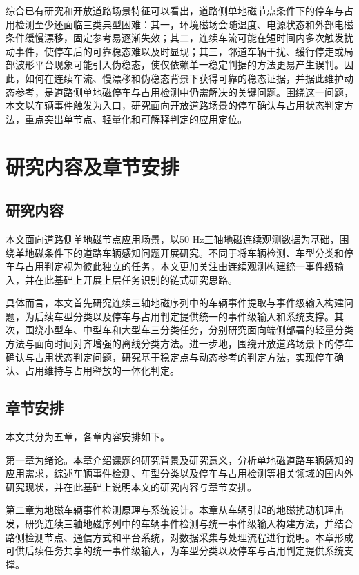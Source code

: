 \documentclass{xdupgthesis}
\begin{document}
综合已有研究和开放道路场景特征可以看出，道路侧单地磁节点条件下的停车与占用检测至少还面临三类典型困难：其一，环境磁场会随温度、电源状态和外部电磁条件缓慢漂移，固定参考易逐渐失效；其二，连续车流可能在短时间内多次触发扰动事件，使停车后的可靠稳态难以及时显现；其三，邻道车辆干扰、缓行停走或局部波形平台现象可能引入伪稳态，使仅依赖单一稳定判据的方法更易产生误判。因此，如何在连续车流、慢漂移和伪稳态背景下获得可靠的稳态证据，并据此维护动态参考，是道路侧单地磁停车与占用检测中仍需解决的关键问题。围绕这一问题，本文以车辆事件触发为入口，研究面向开放道路场景的停车确认与占用状态判定方法，重点突出单节点、轻量化和可解释判定的应用定位。


\section{研究内容及章节安排}
\label{sec:intro_content}

\subsection{研究内容}
\label{sec:research_content}

本文面向道路侧单地磁节点应用场景，以50 Hz三轴地磁连续观测数据为基础，围绕单地磁条件下的道路车辆感知问题开展研究。不同于将车辆检测、车型分类和停车与占用判定视为彼此独立的任务，本文更加关注由连续观测构建统一事件级输入，并在此基础上开展上层任务识别的链式研究思路。

具体而言，本文首先研究连续三轴地磁序列中的车辆事件提取与事件级输入构建问题，为后续车型分类以及停车与占用判定提供统一的事件级输入和系统支撑。其次，围绕小型车、中型车和大型车三分类任务，分别研究面向端侧部署的轻量分类方法与面向时间对齐增强的离线分类方法。进一步地，围绕开放道路场景下的停车确认与占用状态判定问题，研究基于稳定点与动态参考的判定方法，实现停车确认、占用维持与占用释放的一体化判定。

\subsection{章节安排}
\label{sec:thesis_organization}

本文共分为五章，各章内容安排如下。

第一章为绪论。本章介绍课题的研究背景及研究意义，分析单地磁道路车辆感知的应用需求，综述车辆事件检测、车型分类以及停车与占用检测等相关领域的国内外研究现状，并在此基础上说明本文的研究内容与章节安排。

第二章为地磁车辆事件检测原理与系统设计。本章从车辆引起的地磁扰动机理出发，研究连续三轴地磁序列中的车辆事件检测与统一事件级输入构建方法，并结合路侧检测节点、通信方式和平台系统，对数据采集与处理流程进行说明。本章形成可供后续任务共享的统一事件级输入，为车型分类以及停车与占用判定提供系统支撑。
\end{document}
